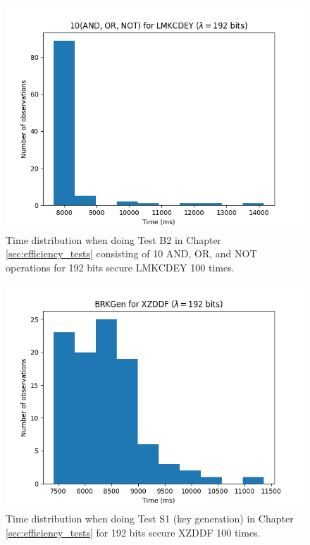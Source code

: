 \begin{figure}[ht]
    \centering
    \includegraphics[width=0.8\linewidth]{data/figures/LMKCDEY_STD192_10AND_OR_NOT.png}
    \caption{Time distribution when doing Test B2 in Chapter \ref{sec:efficiency_tests} consisting of 10 AND, OR, and NOT operations for 192 bits secure LMKCDEY 100 times.}
    \label{fig:distr_lmkcdey192_10}
\end{figure}

\begin{figure}[ht]
    \centering
    \includegraphics[width=0.8\linewidth]{data/figures/XZDDF_STD192_BRKGen.png}
    \caption{Time distribution when doing Test S1 (key generation) in Chapter \ref{sec:efficiency_tests} for 192 bits secure XZDDF 100 times.}
    \label{fig:distr_xzddf192_keygen}
\end{figure}

